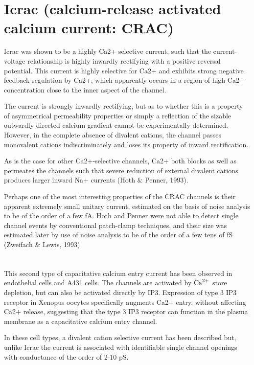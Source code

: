 \section{Icrac (calcium-release activated calcium current: CRAC)}
\label{sec:Icrac}
\label{sec:CRAC}

Icrac was shown to be a highly Ca2+ selective current, such that the
current-voltage relationship is highly inwardly rectifying with a positive
reversal potential. This current is highly selective for Ca2+ and exhibits
strong negative feedback regulation by Ca2+, which apparently occurs in a region
of high Ca2+ concentration close to the inner aspect of the channel.

The current is strongly inwardly rectifying, but as to whether this is a
property of asymmetrical permeability properties or simply a reflection of the
sizable outwardly directed calcium gradient cannot be experimentally determined.
However, in the complete absence of divalent cations, the channel passes
monovalent cations indiscriminately and loses its property of inward
rectification.

As is the case for other Ca2+-selective channels, Ca2+ both blocks as well as
permeates the channels such that severe reduction of external divalent cations
produces larger inward Na+ currents (Hoth \& Penner, 1993).

Perhaps one of the most interesting properties of the CRAC channels is their
apparent extremely small unitary current, estimated on the basis of noise
analysis to be of the order of a few fA.
Hoth and Penner were not able to detect single channel events by conventional
patch-clamp techniques, and their size was estimated later by use of noise
analysis to be of the order of a few tens of fS (Zweifach \& Lewis, 1993)

\section{}

This second type of capacitative calcium entry current has been observed in
endothelial cells and A431 cells.
The channels are activated by ${\text{Ca}^{2+}}$ store depletion, but can also be activated
directly by IP3.
Expression of type 3 IP3 receptor in Xenopus oocytes specifically augments Ca2+
entry, without affecting Ca2+ release, suggesting that the type 3 IP3 receptor
can function in the plasma membrane as a capacitative calcium entry channel.

In these cell types, a divalent cation selective current has been described but,
unlike Icrac the current is associated with identifiable single channel openings
with conductance of the order of 2-10 pS.

